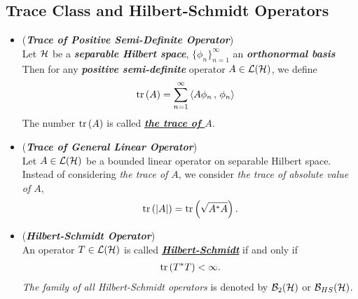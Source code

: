\documentclass[11pt]{article}
\begin{document}
\subsection{Trace Class and Hilbert-Schmidt Operators}
\begin{itemize}
\item \begin{definition} (\emph{\textbf{Trace of Positive Semi-Definite Operator}})\\
Let ${\mathcal H}$ be a \textbf{\emph{separable Hilbert space}}, $\{\phi_n\}_{n=1}^{\infty}$ an \textbf{\emph{orthonormal basis}} Then  for any \textbf{\emph{positive semi-definite}} operator $A \in {\mathcal L}({\mathcal H})$, we define
\begin{align*}
\mathrm{tr}\left(A \right) &= \sum_{n=1}^{\infty}\left\langle A\phi_n\,,\, \phi_n \right\rangle
\end{align*} The number $\mathrm{tr}\left(A \right)$ is called \underline{\textbf{\emph{the trace of $A$}}}.
\end{definition} 

\item \begin{remark} (\emph{\textbf{Trace of General Linear Operator}})\\
Let $A \in {\mathcal L}({\mathcal H})$ be a bounded linear operator on separable Hilbert space. Instead of considering \emph{the trace of $A$}, we consider \emph{the trace of absolute value of $A$},
\begin{align*}
\mathrm{tr}\left(\left\lvert A \right\rvert \right) = \mathrm{tr}\left(\sqrt{A^{*}A} \right).
\end{align*}
\end{remark}

\item \begin{definition} (\emph{\textbf{Hilbert-Schmidt Operator}}) \\
An operator $T \in {\mathcal L}({\mathcal H})$ is called  \underline{\textbf{\emph{Hilbert-Schmidt}}} if and only if
\begin{align*}
\mathrm{tr}\left(T^{*}T \right) < \infty.
\end{align*}
\emph{The family of all Hilbert-Schmidt operators} is denoted by ${\mathcal B}_2({\mathcal H})$ or ${\mathcal B}_{HS}({\mathcal H})$.
\end{definition}


\end{itemize}
\end{document}
